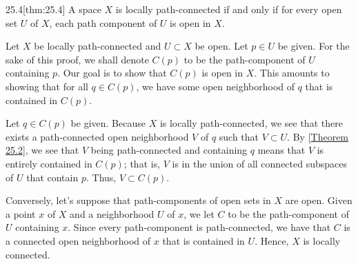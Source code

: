 \begin{thmBox}{25.4}[thm:25.4]
    A space \( X \) is locally path-connected if and only if for every open set
    \( U \) of \( X \), each path component of \( U \) is open in \( X \).

    \baseRule

    \begin{proofBox}
        Let \( X \) be locally path-connected and \( U \subset X \) be open.
        Let \( p \in U \) be given.
        For the sake of this proof, we shall denote \( C ( p ) \) to be the
        path-component of \( U \) containing \( p \).
        Our goal is to show that \( C ( p ) \) is open in \( X \).
        This amounts to showing that for all \( q \in C ( p ) \), we have 
        some open neighborhood of \( q \) that is contained in \( C ( p ) \).

        \baseSkip 

        Let \( q \in C ( p ) \) be given.
        Because \( X \) is locally path-connected, we see that there exists a 
        path-connected open neighborhood \( V \) of \( q \) such that 
        \( V \subset U \).
        By [\hyperlink{thm:25.2}{Theorem 25.2}], we see that \( V \) being 
        path-connected and containing \( q \) means that \( V \) is entirely
        contained in \( C ( p ) \); that is, \( V \) is in the union of all 
        connected subspaces of \( U \) that contain \( p \).
        Thus, \( V \subset C ( p ) \).

        \baseSkip

        Conversely, let's suppose that path-components of open sets in \( X \) 
        are open.
        Given a point \( x \) of \( X \) and a neighborhood \( U \) of \( x \),
        we let \( C \) to be the path-component of \( U \) containing \( x \).
        Since every path-component is path-connected, we have that \( C \) is a 
        connected open neighborhood of \( x \) that is contained in \( U \).
        Hence, \( X \) is locally connected.
    \end{proofBox}
\end{thmBox}

